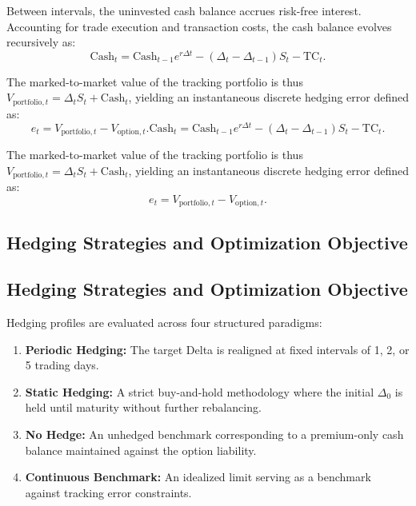 \documentclass{article}
\begin{document}
Between intervals, the uninvested cash balance accrues risk-free interest. Accounting for trade execution and transaction costs, the cash balance evolves recursively as:
\[
\text{Cash}_t = \text{Cash}_{t-1} e^{r \Delta t} - (\Delta_t - \Delta_{t-1}) S_t - \text{TC}_t.
\]

The marked-to-market value of the tracking portfolio is thus $V_{\text{portfolio}, t} = \Delta_t S_t + \text{Cash}_t$, yielding an instantaneous discrete hedging error defined as:
\[
e_t = V_{\text{portfolio},t} - V_{\text{option},t}.
\text{Cash}_t = \text{Cash}_{t-1} e^{r \Delta t} - (\Delta_t - \Delta_{t-1}) S_t - \text{TC}_t.
\]

The marked-to-market value of the tracking portfolio is thus $V_{\text{portfolio}, t} = \Delta_t S_t + \text{Cash}_t$, yielding an instantaneous discrete hedging error defined as:
\[
e_t = V_{\text{portfolio},t} - V_{\text{option},t}.
\]

\subsection{Hedging Strategies and Optimization Objective}
\subsection{Hedging Strategies and Optimization Objective}

Hedging profiles are evaluated across four structured paradigms:
\begin{enumerate}
    \item \textbf{Periodic Hedging:} The target Delta is realigned at fixed intervals of 1, 2, or 5 trading days.
    \item \textbf{Static Hedging:} A strict buy-and-hold methodology where the initial $\Delta_0$ is held until maturity without further rebalancing.
    \item \textbf{No Hedge:} An unhedged benchmark corresponding to a premium-only cash balance maintained against the option liability.
    \item \textbf{Continuous Benchmark:} An idealized limit serving as a benchmark against tracking error constraints.
\end{enumerate}
\end{document}
